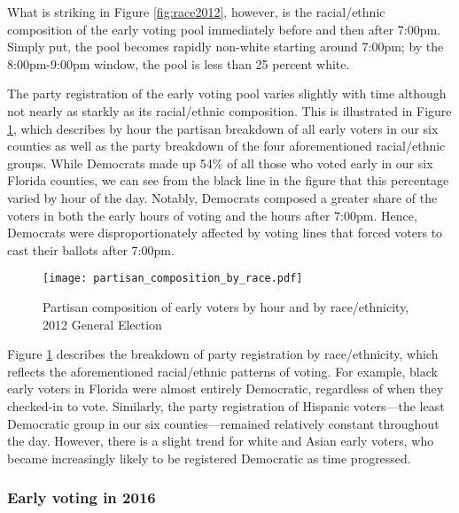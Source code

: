 \documentclass[12pt,titlepage]{article}
\begin{document}
What is striking in Figure \ref{fig:race2012}, however, is the
racial/ethnic composition of the early voting pool immediately before
and then after 7:00pm.  Simply put, the pool becomes rapidly non-white
starting around 7:00pm; by the 8:00pm-9:00pm window, the pool is less
than 25 percent white.

The party registration of the early voting pool varies slightly with
time although not nearly as starkly as its racial/ethnic composition.
This is illustrated in Figure \ref{fig:party2012}, which describes by
hour the partisan breakdown of all early voters in our six counties as
well as the party breakdown of the four aforementioned racial/ethnic
groups.  While Democrats made up 54\% of all those who voted early in
our six Florida counties, we can see from the black line in the figure
that this percentage varied by hour of the day.  Notably, Democrats
composed a greater share of the voters in both the early hours of
voting and the hours after 7:00pm.  Hence, Democrats were
disproportionately affected by voting lines that forced voters to cast
their ballots after 7:00pm.

\begin{figure}[!ht]
\caption{Partisan composition of early voters by hour and by race/ethnicity, 2012
  General Election}
  \label{fig:party2012}
  \centering
    \centering\texttt{[image: partisan\_composition\_by\_race.pdf]}
\end{figure}

%

Figure \ref{fig:party2012} describes the breakdown of party
registration by race/ethnicity, which reflects the aforementioned
racial/ethnic patterns of voting.  For example, black early voters in
Florida were almost entirely Democratic, regardless of when they
checked-in to vote.  Similarly, the party registration of Hispanic
voters---the least Democratic group in our six counties---remained
relatively constant throughout the day.  However, there is a slight
trend for white and Asian early voters, who became increasingly likely
to be registered Democratic as time progressed.


\subsubsection*{Early voting in 2016}
\end{document}

